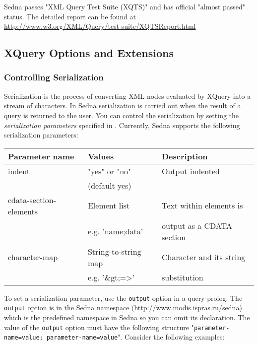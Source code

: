 \documentclass[a4paper,12pt]{article}
\begin{document}
Sedna passes "XML Query Test Suite (XQTS)" and has official "almost passed"
status. The detailed report can be found at
\url{http://www.w3.org/XML/Query/test-suite/XQTSReport.html}


\subsection{XQuery Options and Extensions}
\label{sec:xquery-extensions}

\subsubsection{Controlling Serialization}
\label{indents}
Serialization is the process of converting XML nodes evaluated by XQuery into a
stream of characters. In Sedna serialization is carried out when the result of a
query is returned to the user. You can control the serialization by setting the
\emph{serialization parameters} specified in \cite{paper:query-serialization}.
Currently, Sedna supports the following serialization parameters:

\medskip

\begin{tabular}{|l|l|l|}
\hline
Parameter name & Values & Description \\
\hline
\hline
indent & "yes" or "no" & Output indented \\
  & (default yes) & \\
\hline
cdata-section-elements & Element list & Text within elements is \\
 & e.g. 'name;data' & output as a CDATA section \\
\hline
character-map & String-to-string map & Character and its string \\
& e.g. '\&gt;=>' & substitution \\
\hline
\end{tabular}

\medskip

To set a serialization parameter, use the \verb!output! option in a query
prolog. The \verb!output! option is in the Sedna namespace
(http://www.modis.ispras.ru/sedna) which is the predefined namespace in Sedna so
you can omit its declaration. The value of the \verb!output! option must have
the following structure "\verb!parameter-name=value; parameter-name=value!".
Consider the following examples:
\end{document}
